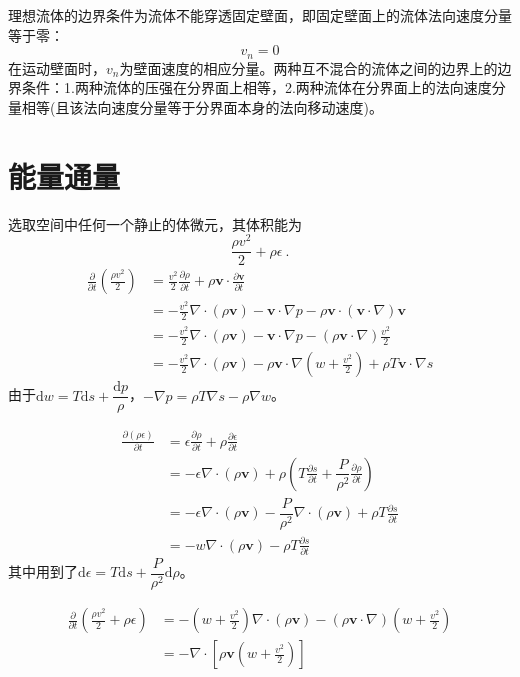 \documentclass[12pt,a4paper]{article}
\renewcommand{\vec}[1]{\boldsymbol{#1}}
\newcommand{\dif}{\mathrm{d}}
\begin{document}
理想流体的边界条件为流体不能穿透固定壁面，即固定壁面上的流体法向速度分量等于零：
\begin{equation}
v_n = 0
\end{equation}
在运动壁面时，$v_n$为壁面速度的相应分量。两种互不混合的流体之间的边界上的边界条件：1.两种流体的压强在分界面上相等，2.两种流体在分界面上的法向速度分量相等(且该法向速度分量等于分界面本身的法向移动速度)。



\section{能量通量}
选取空间中任何一个静止的体微元，其体积能为
\begin{equation*}
\frac{\rho v^2}{2} + \rho \epsilon ~.
\end{equation*}
\begin{align*}
\frac{\partial }{\partial t} \left(\frac{\rho v^2}{2} \right) 
&= \frac{v^2}{2} \frac{\partial \rho}{\partial t} +\rho \vec{v} \cdot \frac{\partial \vec{v} }{\partial t} \\
&= -\frac{v^2}{2} \nabla\cdot (\rho \vec{v}) -\vec{v} \cdot \nabla p -\rho \vec{v} \cdot (\vec{v} \cdot \nabla) \vec{v} \\
&= -\frac{v^2}{2} \nabla\cdot (\rho \vec{v}) -\vec{v} \cdot \nabla p -(\rho \vec{v} \cdot \nabla) \frac{v^2}{2} \\
&= -\frac{v^2}{2} \nabla\cdot (\rho \vec{v}) -\rho \vec{v} \cdot \nabla \left(w +\frac{v^2}{2} \right) +\rho T\vec{v}\cdot \nabla s
\end{align*}
由于$\dif w = T\dif s +\dfrac{\dif p}{\rho}$，$- \nabla p = \rho T  \nabla s - \rho\nabla w$。

\begin{align*}
\frac{\partial (\rho \epsilon)}{\partial t} &= \epsilon \frac{\partial \rho}{\partial t} +\rho \frac{\partial \epsilon}{\partial t} \\
&= -\epsilon\nabla \cdot (\rho \vec{v}) +\rho \left( T\frac{\partial s}{\partial t} +\dfrac{P}{\rho^2} \frac{\partial \rho}{\partial t} \right) \\
&= -\epsilon\nabla \cdot (\rho \vec{v}) -\dfrac{P}{\rho^2} \nabla \cdot (\rho \vec{v}) +\rho  T\frac{\partial s}{\partial t} \\
&= -w \nabla \cdot (\rho \vec{v}) -\rho  T\frac{\partial s}{\partial t}
\end{align*}
其中用到了$\dif \epsilon = T\dif s +\dfrac{P}{\rho^2} \dif \rho$。

\begin{align*}
\frac{\partial }{\partial t} \left(\frac{\rho v^2}{2} + \rho \epsilon \right) &= -\left(w + \frac{v^2}{2} \right) \nabla \cdot (\rho \vec{v}) -(\rho \vec{v}\cdot \nabla) \left(w + \frac{v^2}{2} \right) \\
&= -\nabla \cdot \left[\rho \vec{v} \left(w + \frac{v^2}{2} \right) \right]
\end{align*}
\end{document}
